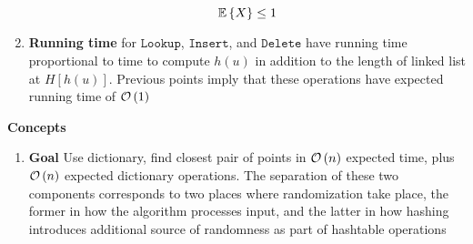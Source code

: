 \documentclass[11pt]{article}
\begin{document}
\begin{defn*}
\begin{enumerate}
        \[
            \mathbb{E}\left\{ X \right\} \leq 1    
        \]
        \item \textbf{Running time} for $\texttt{Lookup}$, $\texttt{Insert}$, and $\texttt{Delete}$ have running time proportional to time to compute $h(u)$ in addition to the length of linked list at $H[h(u)]$. Previous points imply that these operations have expected running time of $\mathcal{O}\left( 1 \right)$
    \end{enumerate}
\end{defn*}





\begin{defn*}
    \textbf{Concepts}
    \begin{enumerate}
        \item \textbf{Goal} Use dictionary, find closest pair of points in $\mathcal{O}\left( n \right)$ expected time, plus $\mathcal{O}\left( n \right)$ expected dictionary operations. The separation of these two components corresponds to two places where randomization take place, the former in how the algorithm processes input, and the latter in how hashing introduces additional source of randomness as part of hashtable operations
    \end{enumerate}
\end{defn*}

\end{document}
